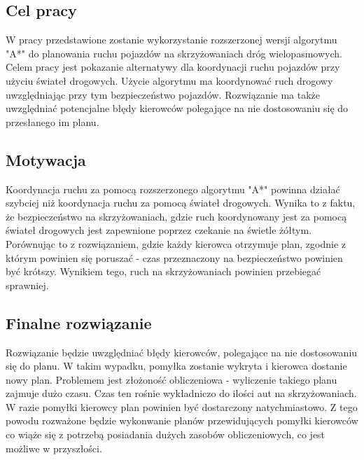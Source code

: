 \documentclass[../main.tex]{subfiles}
\begin{document}
 
\begin{figure}[bh]
\centering
 
\end{figure}

\subsection{Cel pracy}

W pracy przedstawione zostanie wykorzystanie rozszerzonej wersji algorytmu "A*" do planowania ruchu pojazdów na skrzyżowaniach dróg wielopasmowych. Celem pracy jest pokazanie alternatywy dla koordynacji ruchu pojazdów przy użyciu świateł drogowych. Użycie algorytmu ma koordynować ruch drogowy uwzględniając przy tym bezpieczeństwo pojazdów. Rozwiązanie ma także uwzględniać potencjalne błędy kierowców polegające na nie dostosowaniu się do przesłanego im planu.

\subsection{Motywacja}

Koordynacja ruchu za pomocą rozszerzonego algorytmu "A*" powinna działać szybciej niż koordynacja ruchu za pomocą świateł drogowych. Wynika to z faktu, że bezpieczeństwo na skrzyżowaniach, gdzie ruch koordynowany jest za pomocą świateł drogowych jest zapewnione poprzez czekanie na świetle żółtym. Porównując to z rozwiązaniem, gdzie każdy kierowca otrzymuje plan, zgodnie z którym powinien się poruszać - czas przeznaczony na bezpieczeństwo powinien być krótszy. Wynikiem tego, ruch na skrzyżowaniach powinien przebiegać sprawniej.


\subsection{Finalne rozwiązanie}

Rozwiązanie będzie uwzględniać błędy kierowców, polegające na nie dostosowaniu się do planu. W takim wypadku, pomyłka zostanie wykryta i kierowca dostanie nowy plan. Problemem jest złożoność obliczeniowa - wyliczenie takiego planu zajmuje dużo czasu. Czas ten rośnie wykładniczo do ilości aut na skrzyżowaniach. W razie pomyłki kierowcy plan powinien być dostarczony natychmiastowo. Z tego powodu rozważone będzie wykonwanie planów przewidujących pomyłki kierowców co wiąże się z potrzebą posiadania dużych zasobów obliczeniowych, co jest możliwe w przyszłości.
\end{document}
